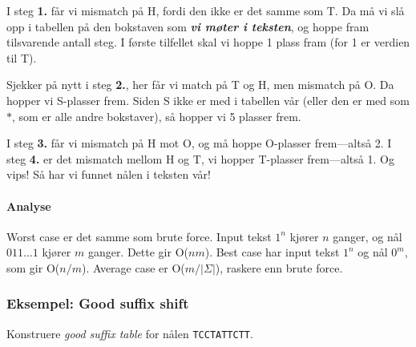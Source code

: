 \documentclass[11pt,a4paper]{article}
\theoremstyle{def}
\begin{document}
I steg \textbf{1.} får vi mismatch på H, fordi den ikke er det samme som T. Da må vi slå opp i tabellen på den bokstaven som \textbf{\textit{vi møter i teksten}}, og hoppe fram tilsvarende antall steg. I første tilfellet skal vi hoppe 1 plass fram (for 1 er verdien til T). 

Sjekker på nytt i steg \textbf{2.}, her får vi match på T og H, men mismatch på O. Da hopper vi S-plasser frem. Siden S ikke er med i tabellen vår (eller den er med som $*$, som er alle andre bokstaver), så hopper vi 5 plasser frem.

I steg \textbf{3.} får vi mismatch på H mot O, og må hoppe O-plasser frem---altså 2. I steg \textbf{4.} er det mismatch mellom H og T, vi hopper T-plasser frem---altså 1. Og vips! Så har vi funnet nålen i teksten vår!

\paragraph{Analyse}
Worst case er det samme som brute force. Input tekst $1^n$ kjører $n$ ganger, og nål $011\dots1$ kjører $m$ ganger. Dette gir O($nm$). Best case har input tekst $1^n$ og nål $0^m$, som gir O($n/m$). Average case er O($m/|\Sigma|$), raskere enn brute force.


\subsubsection{Eksempel: Good suffix shift}
Konstruere \textit{good suffix table} for nålen \texttt{TCCTATTCTT}.
\end{document}
